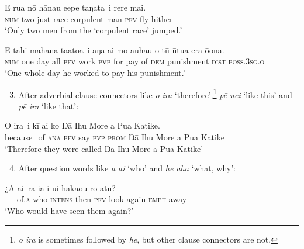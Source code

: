 \ea\label{ex:7.77}
\gll {\ob}E rua nō hānau {\ꞌ}e{\ꞌ}epe taŋata\,{\cb} i rere mai. \\
{\db}\textsc{num} two just race corpulent man \textsc{pfv} fly hither \\

\glt 
‘Only two men from the ‘corpulent race’ jumped.’ \textstyleExampleref{[Mtx-3-02.038]}
\z

\ea\label{ex:7.78}
\gll {\ob}E tahi mahana ta{\ꞌ}ato{\ꞌ}a\,{\cb} i aŋa ai mo {\ꞌ}auhau o tū ūtu{\ꞌ}a  era ō{\ꞌ}ona.\\
{\db}\textsc{num} one day all \textsc{pfv} work \textsc{pvp} for pay of \textsc{dem} punishment  \textsc{dist} \textsc{poss.3sg.o}\\

\glt
‘One whole day he worked to pay his punishment.’ \textstyleExampleref{[R250.026]} 
\z

\begin{enumerate}
\setcounter{enumi}{2} 
\item 
After adverbial clause connectors like \textit{{\ꞌ}o ira} ‘therefore’,\footnote{\label{fn:339}\textit{{\ꞌ}o ira} is sometimes followed by \textit{he}, but other clause connectors are not.} \textit{pē nei} ‘like this’ and \textit{pē ira} ‘like that’: 

\end{enumerate}

\ea\label{ex:7.79}
\gll {\ob}{\ꞌ}O ira\,{\cb} i kī ai ko Ŋā Ihu More {\ꞌ}a Pua Katike.  \\
{\db}because\_of \textsc{ana} \textsc{pfv} say \textsc{pvp} \textsc{prom} Ŋā Ihu More {\ꞌ}a Pua Katike  \\

\glt
‘Therefore they were called Ŋā Ihu More {\ꞌ}a Pua Katike’ \textstyleExampleref{[R310.253]} 
\z

\begin{enumerate}
\setcounter{enumi}{3} 
\item 
After question words like \textit{{\ꞌ}a {\ꞌ}ai} ‘who’ and \textit{he aha} ‘what, why’: 

\end{enumerate}

\ea\label{ex:7.80}
\gll ¿{\ob}{\ꞌ}A {\ꞌ}ai\,{\cb} rā ia i u{\ꞌ}i haka{\ꞌ}ou rō atu? \\
~~~of\textsc{.a} who \textsc{intens} then \textsc{pfv} look again \textsc{emph} away \\

\glt 
‘Who would have seen them again?’ \textstyleExampleref{[R361.019]} 
\z

